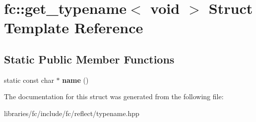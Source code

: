 \hypertarget{structfc_1_1get__typename_3_01void_01_4}{}\section{fc\+:\+:get\+\_\+typename$<$ void $>$ Struct Template Reference}
\label{structfc_1_1get__typename_3_01void_01_4}
\subsection*{Static Public Member Functions}
\begin{DoxyCompactItemize}
\item 
\mbox{\label{structfc_1_1get__typename_3_01void_01_4_af79168b56253e91903c2013a9495b27d}} 
static const char $\ast$ {\bfseries name} ()
\end{DoxyCompactItemize}


The documentation for this struct was generated from the following file\+:\begin{DoxyCompactItemize}
\item 
libraries/fc/include/fc/reflect/typename.\+hpp\end{DoxyCompactItemize}
